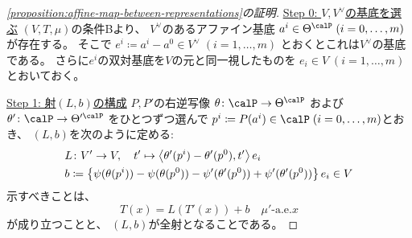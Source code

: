 \documentclass[report]{jlreq}
\begin{document}
\begin{proof}[\cref{proposition:affine-map-between-representations}の証明]
    \uline{Step 0: $V, V^\vee$の基底を選ぶ} \quad
    $(V, T, \mu)$の条件Bより、
    $V^\vee$のあるアファイン基底
    $a^i \in \Theta^\calP \; (i = 0, \dots, m)$
    が存在する。
    そこで
    $e^i \coloneqq a^i - a^0 \in V^\vee \; (i = 1, \dots, m)$
    とおくとこれは$V^\vee$の基底である。
    さらに$e^i$の双対基底を$V$の元と同一視したものを
    $e_i \in V \; (i = 1, \dots, m)$とおいておく。

    \uline{Step 1: 射$(L, b)$の構成} \quad
    $P, P'$の右逆写像
    $\theta \colon \calP \to \Theta^\calP$
    および
    $\theta' \colon \calP \to \Theta'^\calP$
    をひとつずつ選んで
    $p^i \coloneqq P(a^i) \in \calP \; (i = 0, \dots, m)$とおき、
    $(L, b)$を次のように定める:
    \begin{alignat}{1}
        &L \colon V' \to V,
            \quad
            t' \mapsto
                \left\langle{\theta'(p^i) - \theta'(p^0)},{t'}\right\rangle e_i
            \\
        &b \coloneqq
            \left\{{
                \psi(\theta(p^i)) - \psi(\theta(p^0))
                - \psi'(\theta'(p^0)) + \psi'(\theta'(p^0))
            }\right\} e_i
            \in V
    \end{alignat}
    示すべきことは、
    \begin{equation}
        T(x) = L(T'(x)) + b
            \quad
            \text{$\mu'$-a.e.$x$}
    \end{equation}
    が成り立つことと、
    $(L, b)$が全射となることである。


\end{proof}
\end{document}
